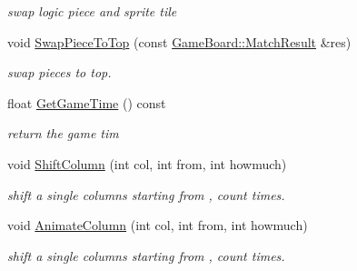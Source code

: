 \begin{DoxyCompactItemize}
\begin{DoxyCompactList}\small\item\em swap logic piece and sprite tile \end{DoxyCompactList}\item 
\hypertarget{class_game_logic_acfed5f014ab0f823871753c7701fae35}{void \hyperlink{class_game_logic_acfed5f014ab0f823871753c7701fae35}{Swap\-Piece\-To\-Top} (const \hyperlink{struct_game_board_1_1_match_result}{Game\-Board\-::\-Match\-Result} \&res)}\label{class_game_logic_acfed5f014ab0f823871753c7701fae35}

\begin{DoxyCompactList}\small\item\em swap pieces to top. \end{DoxyCompactList}\item 
\hypertarget{class_game_logic_a6cb3f1a381c549578b6684adfe1c9867}{float \hyperlink{class_game_logic_a6cb3f1a381c549578b6684adfe1c9867}{Get\-Game\-Time} () const }\label{class_game_logic_a6cb3f1a381c549578b6684adfe1c9867}

\begin{DoxyCompactList}\small\item\em return the game tim \end{DoxyCompactList}\item 
void \hyperlink{class_game_logic_a10cbf1ec8dbd9835d80fd98b9136cf33}{Shift\-Column} (int col, int from, int howmuch)
\begin{DoxyCompactList}\small\item\em shift a single columns starting from , count times. \end{DoxyCompactList}\item 
\hypertarget{class_game_logic_a0053fdc7f9159d5ad5114189211addc8}{void \hyperlink{class_game_logic_a0053fdc7f9159d5ad5114189211addc8}{Animate\-Column} (int col, int from, int howmuch)}\label{class_game_logic_a0053fdc7f9159d5ad5114189211addc8}

\begin{DoxyCompactList}\small\item\em shift a single columns starting from , count times. \end{DoxyCompactList}\end{DoxyCompactItemize}
